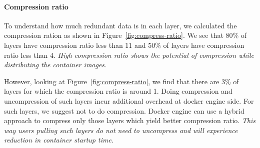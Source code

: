 

\paragraph{Compression ratio}

To understand how much redundant data is in each layer, we calculated the compression ration as shown in Figure~\ref{fig:compress-ratio}. 
We see that 
80\% of layers have compression ratio less than 11 and 50\% of layers have compression ratio less than 4. \emph{High compression
	ratio shows the potential of compression while distributing the container
	images.}

However, looking at Figure~\ref{fig:compress-ratio},%
we find that there are 3\% of layers for which the compression ratio is around 1. Doing
compression and uncompression of such layers incur additional overhead at
docker engine side.  For such layers, we suggest not to do compression.
Docker engine can use a hybrid approach to compress
only those layers which yield better compression ratio. 
\emph{This way users pulling such layers do not need to uncompress
	and will experience reduction in container startup time.}



